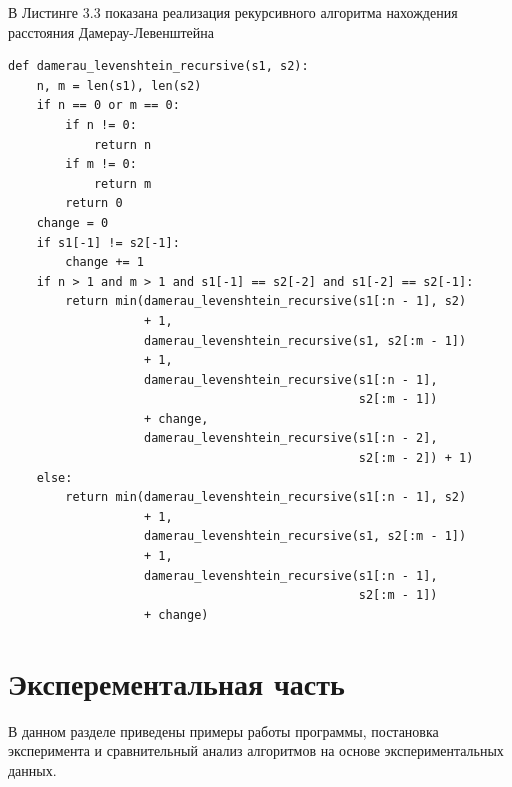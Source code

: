 \documentclass[a4paper,12pt]{report}
\begin{document}
В Листинге 3.3 показана реализация рекурсивного алгоритма нахождения расстояния Дамерау-Левенштейна
\begin{lstlisting}[caption=Функция нахождения расстояния Дамерау-Левенштейна рекурсивно]
def damerau_levenshtein_recursive(s1, s2):
    n, m = len(s1), len(s2)
    if n == 0 or m == 0:
        if n != 0:
            return n
        if m != 0:
            return m
        return 0
    change = 0
    if s1[-1] != s2[-1]:
        change += 1
    if n > 1 and m > 1 and s1[-1] == s2[-2] and s1[-2] == s2[-1]:
        return min(damerau_levenshtein_recursive(s1[:n - 1], s2)
                   + 1,
                   damerau_levenshtein_recursive(s1, s2[:m - 1])
                   + 1,
                   damerau_levenshtein_recursive(s1[:n - 1],
                                                 s2[:m - 1])
                   + change,
                   damerau_levenshtein_recursive(s1[:n - 2],
                                                 s2[:m - 2]) + 1)
    else:
        return min(damerau_levenshtein_recursive(s1[:n - 1], s2)
                   + 1,
                   damerau_levenshtein_recursive(s1, s2[:m - 1])
                   + 1,
                   damerau_levenshtein_recursive(s1[:n - 1],
                                                 s2[:m - 1])
                   + change)
\end{lstlisting}



\chapter{Эксперементальная часть}
В данном разделе приведены примеры работы программы, постановка эксперимента и сравнительный анализ алгоритмов на основе экспериментальных данных.
\end{document}
